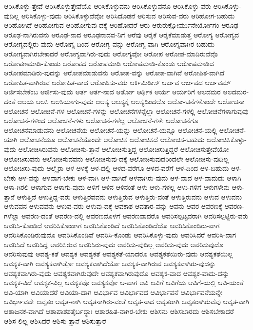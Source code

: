 {ಆರಿಸಿಕೊಳ್ಳು-ತ್ತೇವೆ
ಆರಿಸಿಕೊಳ್ಳುತ್ತೇವೆಯೊ
ಆರಿಸಿಕೊಳ್ಳುವನು
ಆರಿಸಿಕೊಳ್ಳುವನೊ
ಆರಿಸಿಕೊಳ್ಳು-ವರು
ಆರಿಸಿಕೊಳ್ಳು-ವುದಿಲ್ಲ
ಆರಿಸಿಕೊಳ್ಳು-ವುದು
ಆರಿಸಿಕೊಳ್ಳುವೆವೋ
ಆರಿಸಿದೊಡನೆ
ಆರಿಸುವ
ಆರಿಸುವ-ವರು
ಆರಿಹೋಗ-ಬಹುದು
ಆರಿಹೋಗಿದೆ
ಆರಿಹೋಗುವ
ಆರಿಹೋಗುವು-ದಕ್ಕೆ
ಆರಿಹೋದರೆ
ಆರು
ಆರುರುಕ್ಷೋರ್ಮುನೇರ್ಯೋಗಂ
ಆರೂಢ
ಆರೂಢ-ನಾಗಿರುವನು
ಆರೂಢ-ನಾದ
ಆರೂಢನಾದವ-ನಿಗೆ
ಆರೆವು
ಆರೈಕೆ
ಆರೈಕೆಮಾಡುತ್ತ
ಆರೋಗ್ಯ
ಆರೋಗ್ಯದ
ಆರೋಗ್ಯದಲ್ಲಿರು-ವುದು
ಆರೋಗ್ಯ-ದಿಂದ
ಆರೋಗ್ಯ-ವನ್ನು
ಆರೋಗ್ಯ-ವಾಗಿ
ಆರೋಗ್ಯವಾಗಿರ-ಬಹುದು
ಆರೋಗ್ಯವಾಗಿರಬೇಕಾದರೆ
ಆರೋಗ್ಯವಾಗಿರು-ವುದು
ಆರೋಗ್ಯವೋ
ಆರೋಪ
ಆರೋಪ-ಮಾಡಿರುವೆವೊ
ಆರೋಪಣಮಾಡಿ-ಕೊಂಡು
ಆರೋಪದ
ಆರೋಪಮಾಡಿ
ಆರೋಪಮಾಡಿ-ಕೊಂಡು
ಆರೋಪಮಾಡಿದ
ಆರೋಪಮಾಡಿರು-ವುದನ್ನು
ಆರೋಪಮಾಡುವನು
ಆರೋಪ-ವನ್ನು
ಆರೋಪ-ವಾಗಿವೆ
ಆರೋಪಿತ-ವಾಗಿದೆ
ಆರೋಪಿತ-ವಾಗಿರುವ
ಆರೋಪಿತ-ವಾದ
ಆರೋಪಿಸು-ವರು
ಆರ್ಕಿಮಿಡೀಸ್
ಆರ್ಜವ
ಆರ್ಜವದ
ಆರ್ಜವಮ್
ಆರ್ಜಿಸಬೇಕೆಂಬ
ಆರ್ಜಿಸು-ವುದು
ಆರ್ತ
ಆರ್ತ-ನಾದ
ಆರ್ತೋ
ಆರ್ಥಿಕ
ಆರ್ಯ
ಆರ್ಯರಿಗೆ
ಆಲದಮರ
ಆಲದಮರ-ದಂತೆ
ಆಲಯ
ಆಲಸಿ
ಆಲಸಿಯಾಗು-ವುದು
ಆಲಸ್ಯ
ಆಲಸ್ಯಕ್ಕೆ
ಆಲಸ್ಯದಿಂದಲೊ
ಆಲೋ-ಚನೆಗಳೊಂದೇ
ಆಲೋಚನಾ
ಆಲೋಚನೆ
ಆಲೋಚನೆ-ಗಳ
ಆಲೋಚನೆ-ಗಳನ್ನು
ಆಲೋಚನೆಗಳನ್ನೆಲ್ಲಾ
ಆಲೋಚನೆ-ಗಳಲ್ಲಿ
ಆಲೋಚನೆಗಳಾಗುವುವು
ಆಲೋಚನೆ-ಗಳಿಂದ
ಆಲೋಚನೆ-ಗಳು
ಆಲೋಚನೆ-ಗಳೆಲ್ಲ
ಆಲೋಚನೆ-ಗಳೇ
ಆಲೋಚನೆಗೂ
ಆಲೋಚನೆಮಾಡುವನು
ಆಲೋಚನೆಯ
ಆಲೋಚನೆ-ಯನ್ನು
ಆಲೋಚನೆ-ಯನ್ನೂ
ಆಲೋಚನೆ-ಯಲ್ಲಿ
ಆಲೋಚನೆ-ಯಾಗಿ
ಆಲೋಚನೆಯೂ
ಆಲೋಚನೆಯೊಂದೇ
ಆಲೋಚಿಸ
ಆಲೋಚಿಸದೆ
ಆಲೋಚಿಸ-ಬಹುದು
ಆಲೋಚಿಸಿಕೊಳ್ಳು-ವುದು
ಆಲೋಚಿಸಿರುವನು
ಆಲೋಚಿಸು-ತ್ತಾನೆ
ಆಲೋಚಿಸುತ್ತಿದ್ದ
ಆಲೋಚಿಸುತ್ತಿದ್ದರೆ
ಆಲೋಚಿಸುತ್ತೇವೆಯೋ
ಆಲೋಚಿಸುವನು
ಆಲೋಚಿಸುವವನು
ಆಲೋಚಿಸುವು-ದಕ್ಕೆ
ಆಲೋಚಿಸುವುದರಿಂದಲೇ
ಆಲೋಚಿಸು-ವುದಿಲ್ಲ
ಆಲೋಚಿಸು-ವುದು
ಆಲ್ಮೈರಾ
ಆಳ
ಆಳಕ್ಕೆ
ಆಳ-ದಲ್ಲಿ
ಆಳದ-ವರೆಗೂ
ಆಳದ-ವರೆಗೆ
ಆಳ-ದಿಂದ
ಆಳ-ಬಹುದು
ಆಳ-ಬೇಕು
ಆಳ-ವನ್ನು
ಆಳವಾಗ-ಬೇಕು
ಆಳ-ವಾಗಿ
ಆಳ-ವಾಗಿದೆ
ಆಳವಾಗಿರು-ವುದು
ಆಳ-ವಾದ
ಆಳ-ವಾದುದು
ಆಳಾಗಿ
ಆಳಾ-ಗಿರಲಿ
ಆಳಾಗುವ
ಆಳಾಗು-ವುದು
ಆಳಿಗೆ
ಆಳಿನ
ಆಳಿನಂತೆ
ಆಳು
ಆಳು-ಗಳಲ್ಲ
ಆಳು-ಗಳಿಗೆ
ಆಳುಗಳೇನು
ಆಳು-ತ್ತಾನೆ
ಆಳುತ್ತಿದೆ
ಆಳುತ್ತಿದ್ದ-ವರು
ಆಳುತ್ತಿರವವನು
ಆಳುತ್ತಿರುವ
ಆಳುತ್ತಿರು-ವಂತೆ
ಆಳುತ್ತಿರುವನು
ಆಳುವ
ಆಳುವನು
ಆಳುವವನ
ಆಳುವವನು
ಆಳುವ-ವರು
ಆಳುವು-ದಕ್ಕೆ
ಆವಕಾಶ
ಆವತಾರ-ವನ್ನು
ಆವನು
ಆವರ
ಆವರಣಕ್ಕೆ
ಆವರಣ-ಗಳೆಲ್ಲಾ
ಆವರಣ-ದಂತೆ
ಆವರಣ-ದಲ್ಲಿ
ಆವರಣದೊಳಗೆ
ಆವರಣವಾದರೊ
ಆವರಿಸಲ್ಪಟ್ಟವರಾಗಿ
ಆವರಿಸಲ್ಪಟ್ಟಿರು-ವರು
ಆವರಿಸಿ-ಕೊಂಡಿದೆ
ಆವರಿಸಿಕೊಂಡಾಗ
ಆವರಿಸಿಕೊಂಡಿದೆ
ಆವರಿಸಿಕೊಂಡಿದೆಯೊ
ಆವರಿಸಿಕೊಂಡಿರು-ವಾಗ
ಆವರಿಸಿಕೊಂಡಿರುವುದೊ
ಆವರಿಸಿಕೊಂಡಿವೆ
ಆವರಿಸಿ-ಕೊಂಡು
ಆವರಿಸಿಕೊಳ್ಳು-ವುದು
ಆವರಿಸಿದರೆ
ಆವರಿಸಿ-ದಾಗ
ಆವರಿಸಿದೆ
ಆವರಿಸಿದ್ದ
ಆವರಿಸಿರುವ
ಆವರಿಸಿರು-ವುದು
ಆವರಿಸು-ವುದಿಲ್ಲ
ಆವರಿಸು-ವುದು
ಆವರಿಸುವುದೊ
ಆವರಿಸುವುವು
ಆವಶ್ಯ-ಕತೆ
ಆವಶ್ಯಕ
ಆವಶ್ಯಕತೆ
ಆವಶ್ಯಕತೆ-ಯಾದರೂ
ಆವಶ್ಯಕತೆಯಿರು-ವುದು
ಆವಶ್ಯಕತೆಯಿಲ್ಲ
ಆವಶ್ಯಕ-ವಾಗಿ
ಆವಶ್ಯಕವಾಗಿತ್ತೋ
ಆವಶ್ಯಕವಾಗಿದೆಯೋ
ಆವಶ್ಯಕ-ವಾಗಿರುವ
ಆವಶ್ಯಕವಾಗಿರು-ವುದನ್ನು
ಆವಶ್ಯಕವಾಗಿರು-ವುದು
ಆವಶ್ಯಕವಾಗಿರುವುದೇ
ಆವಶ್ಯಕವಾಗಿರುವುದೊ
ಆವಶ್ಯಕ-ವಾದ
ಆವಶ್ಯಕ-ವಾದು-ದನ್ನು
ಆವಶ್ಯಕ-ವಿದೆ
ಆವಶ್ಯಕ-ವಿಲ್ಲ
ಆವಶ್ಯಕವೊ
ಆವಶ್ಯಕವೋ
ಆ-ವಾಗ
ಆವಿ
ಆವಿಗೆ
ಆವಿಗೆಯ
ಆವಿಗೆ-ಯಲ್ಲಿ
ಆವಿ-ಯಂತೆ
ಆವಿ-ಯಾಗಿ
ಆವಿಯಾದರೆ
ಆವಿಯಾ-ದಾಗ
ಆವಿರ್ಭಾವ
ಆವಿರ್ಭಾವದ
ಆವಿರ್ಭಾವನೆ
ಆವಿರ್ಭಾವನೆಯನ್ನೇ
ಆವಿರ್ಭಾವವೇ
ಆವೃತಂ
ಆವೃತ-ನಾಗಿ
ಆವೃತನಾಗಿರು-ವಂತೆ
ಆವೃತ-ನಾದ
ಆವೃತರಾಗಿ
ಆವೃತರಾಗಿರುವೆವು
ಆವೃತ-ವಾಗಿ
ಆಶಾಜನಕ-ವಾಗಿದೆ
ಆಶಾಪಾಶಶತೈರ್ಬದ್ಧಾಃ
ಆಶಾರಹಿತ-ನಾಗಿರ-ಬೇಕು
ಆಶಿಸನು
ಆಶಿಸಬಾರದು
ಆಶಿಸಬೇಕಾದರೆ
ಆಶಿಸ-ಲಿಲ್ಲ
ಆಶಿಸಿದರೆ
ಆಶಿಸು-ತ್ತಾನೆ
ಆಶಿಸುತ್ತಾರೆ
}
